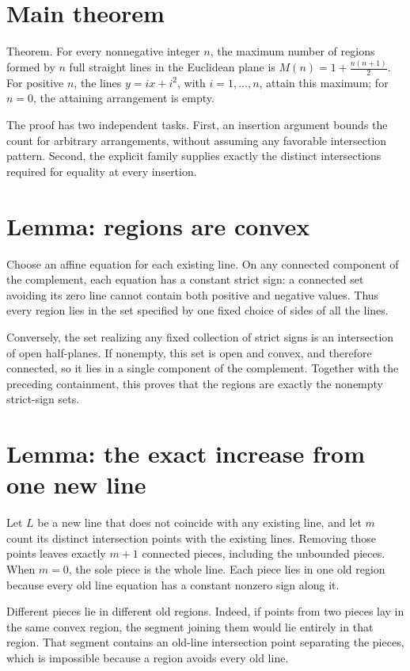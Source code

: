 \documentclass[11pt]{article}
\begin{document}
\section{Main theorem}
Theorem. For every nonnegative integer $n$, the maximum number of regions formed by $n$ full straight lines in the Euclidean plane is $M(n)=1+\frac{n(n+1)}{2}$. For positive $n$, the lines $y=ix+i^2$, with $i=1,\ldots,n$, attain this maximum; for $n=0$, the attaining arrangement is empty.

The proof has two independent tasks. First, an insertion argument bounds the count for arbitrary arrangements, without assuming any favorable intersection pattern. Second, the explicit family supplies exactly the distinct intersections required for equality at every insertion.

\section{Lemma: regions are convex}
Choose an affine equation for each existing line. On any connected component of the complement, each equation has a constant strict sign: a connected set avoiding its zero line cannot contain both positive and negative values. Thus every region lies in the set specified by one fixed choice of sides of all the lines.

Conversely, the set realizing any fixed collection of strict signs is an intersection of open half-planes. If nonempty, this set is open and convex, and therefore connected, so it lies in a single component of the complement. Together with the preceding containment, this proves that the regions are exactly the nonempty strict-sign sets.

\section{Lemma: the exact increase from one new line}
Let $L$ be a new line that does not coincide with any existing line, and let $m$ count its distinct intersection points with the existing lines. Removing those points leaves exactly $m+1$ connected pieces, including the unbounded pieces. When $m=0$, the sole piece is the whole line. Each piece lies in one old region because every old line equation has a constant nonzero sign along it.

Different pieces lie in different old regions. Indeed, if points from two pieces lay in the same convex region, the segment joining them would lie entirely in that region. That segment contains an old-line intersection point separating the pieces, which is impossible because a region avoids every old line.
\end{document}
